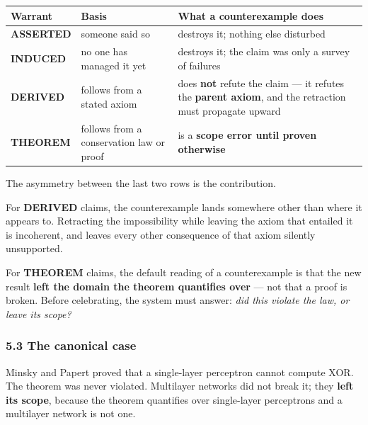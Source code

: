 \documentclass[
  11pt,
  a4paper,
]{article}
\begin{document}
\begin{longtable}[]{@{}
  >{\raggedright\arraybackslash}p{}
  >{\raggedright\arraybackslash}p{}
  >{\raggedright\arraybackslash}p{}@{}}
\toprule\noalign{}
\begin{minipage}[b]{\linewidth}\raggedright
Warrant
\end{minipage} & \begin{minipage}[b]{\linewidth}\raggedright
Basis
\end{minipage} & \begin{minipage}[b]{\linewidth}\raggedright
What a counterexample does
\end{minipage} \\
\midrule\noalign{}
\endhead
\bottomrule\noalign{}
\endlastfoot
\textbf{ASSERTED} & someone said so & destroys it; nothing else
disturbed \\
\textbf{INDUCED} & no one has managed it yet & destroys it; the claim
was only a survey of failures \\
\textbf{DERIVED} & follows from a stated axiom & does \textbf{not}
refute the claim --- it refutes the \textbf{parent axiom}, and the
retraction must propagate upward \\
\textbf{THEOREM} & follows from a conservation law or proof & is a
\textbf{scope error until proven otherwise} \\
\end{longtable}

The asymmetry between the last two rows is the contribution.

For \textbf{DERIVED} claims, the counterexample lands somewhere other
than where it appears to. Retracting the impossibility while leaving the
axiom that entailed it is incoherent, and leaves every other consequence
of that axiom silently unsupported.

For \textbf{THEOREM} claims, the default reading of a counterexample is
that the new result \textbf{left the domain the theorem quantifies over}
--- not that a proof is broken. Before celebrating, the system must
answer: \emph{did this violate the law, or leave its scope?}

\subsubsection{5.3 The canonical case}\label{the-canonical-case}

Minsky and Papert proved that a single-layer perceptron cannot compute
XOR. The theorem was never violated. Multilayer networks did not break
it; they \textbf{left its scope}, because the theorem quantifies over
single-layer perceptrons and a multilayer network is not one.
\end{document}
